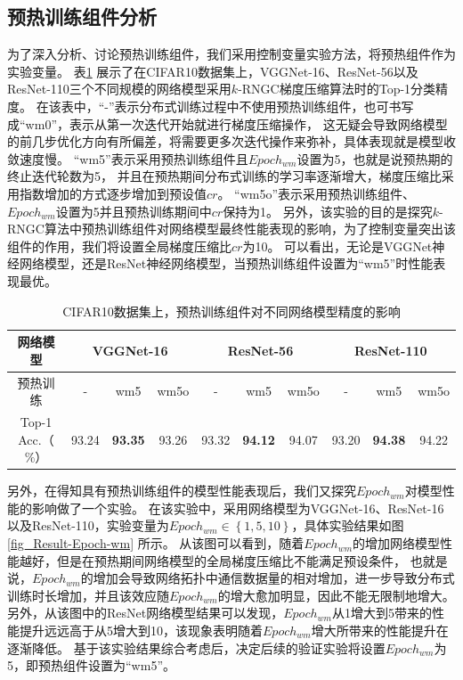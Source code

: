 \documentclass{xdupgthesis}
\begin{document}
\subsection{预热训练组件分析}
\label{sec_ComponentAnalyze}
为了深入分析、讨论预热训练组件，我们采用控制变量实验方法，将预热组件作为实验变量。
表\ref*{tab_Result-k-rngc-warmup-contrast} 展示了在CIFAR10数据集上，VGGNet-16、ResNet-56以及ResNet-110三个不同规模的网络模型采用$k$-RNGC梯度压缩算法时的Top-1分类精度。
在该表中，“-”表示分布式训练过程中不使用预热训练组件，也可书写成“wm0”，表示从第一次迭代开始就进行梯度压缩操作，
这无疑会导致网络模型的前几步优化方向有所偏差，将需要更多次迭代操作来弥补，具体表现就是模型收敛速度慢。
“wm5”表示采用预热训练组件且$Epoch_{wm}$设置为5，也就是说预热期的终止迭代轮数为5，
并且在预热期间分布式训练的学习率逐渐增大，梯度压缩比采用指数增加的方式逐步增加到预设值$cr$。
“wm5o”表示采用预热训练组件、$Epoch_{wm}$设置为5并且预热训练期间中$cr$保持为1。
另外，该实验的目的是探究$k$-RNGC算法中预热训练组件对网络模型最终性能表现的影响，为了控制变量突出该组件的作用，我们将设置全局梯度压缩比$cr$为10。
可以看出，无论是VGGNet神经网络模型，还是ResNet神经网络模型，当预热训练组件设置为“wm5”时性能表现最优。

\renewcommand{\arraystretch}{1.3}
\begin{table}[ht]
    \centering
    \begin{threeparttable}
        \caption{CIFAR10数据集上，预热训练组件对不同网络模型精度的影响}
        \label{tab_Result-k-rngc-warmup-contrast}
        \begin{tabular}{c|c|c|c|c|c|c|c|c|c}
            \toprule
            \toprule
            网络模型 & \multicolumn{3}{c|}{VGGNet-16} & \multicolumn{3}{c|}{ResNet-56} & \multicolumn{3}{c}{ResNet-110} \\
            \midrule
            预热训练 & - & wm5 & wm5o & - & wm5 & wm5o & - & wm5 & wm5o \\
            \midrule
            Top-1 Acc.（$\%$） & 93.24 & \textbf{93.35} & 93.26  & 93.32 & \textbf{94.12} & 94.07 & 93.20 & \textbf{94.38} & 94.22 \\
            \bottomrule
            \bottomrule
        \end{tabular}
    \end{threeparttable}
\end{table}

另外，在得知具有预热训练组件的模型性能表现后，我们又探究$Epoch_{wm}$对模型性能的影响做了一个实验。
在该实验中，采用网络模型为VGGNet-16、ResNet-16以及ResNet-110，实验变量为$Epoch_{wm}\in \left\{1, 5, 10 \right\}$，具体实验结果如图 \ref{fig_Result-Epoch-wm} 所示。
从该图可以看到，随着$Epoch_{wm}$的增加网络模型性能越好，但是在预热期间网络模型的全局梯度压缩比不能满足预设条件，
也就是说，$Epoch_{wm}$的增加会导致网络拓扑中通信数据量的相对增加，进一步导致分布式训练时长增加，并且该效应随$Epoch_{wm}$的增大愈加明显，因此不能无限制地增大。
另外，从该图中的ResNet网络模型结果可以发现，$Epoch_{wm}$从1增大到5带来的性能提升远远高于从5增大到10，该现象表明随着$Epoch_{wm}$增大所带来的性能提升在逐渐降低。
基于该实验结果综合考虑后，决定后续的验证实验将设置$Epoch_{wm}$为5，即预热组件设置为“wm5”。
\end{document}
